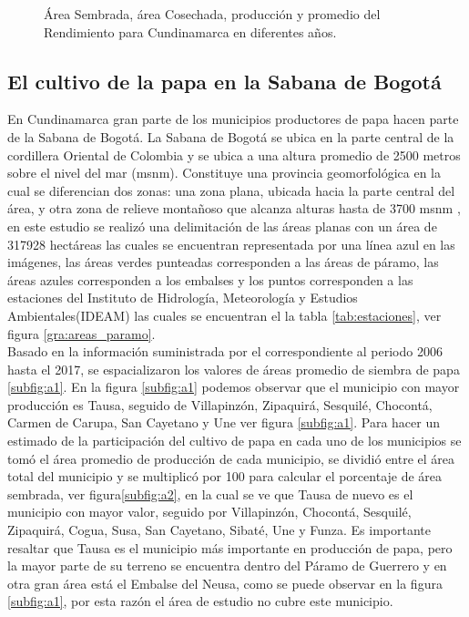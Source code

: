 \documentclass[11pt]{article}
\begin{document}
\begin{landscape}
\begin{figure}[h]
\begin{center}
	\end{center}
	
	\caption{Área Sembrada, área Cosechada, producción y promedio del Rendimiento para Cundinamarca en diferentes años.}
	 \label{gra:papa_cund}
\end{figure}

\end{landscape}

\subsection{El cultivo de la papa en la Sabana de Bogotá}


En Cundinamarca gran parte de los municipios productores de papa hacen parte de la Sabana de Bogotá. La Sabana de Bogotá se ubica en la parte central de la cordillera Oriental de Colombia y se ubica a una altura promedio de 2500 metros sobre el nivel del mar (msnm). Constituye una provincia geomorfológica en la cual se diferencian dos zonas: una zona plana, ubicada hacia la parte central del área, y otra zona de relieve montañoso que alcanza alturas hasta de 3700 msnm \citep{hermelin2007entorno}, en este estudio se realizó una delimitación de las áreas planas con un área de 317928 hectáreas las cuales se encuentran representada por una línea azul en las imágenes, las áreas verdes punteadas corresponden a las áreas de páramo, las áreas azules corresponden a los embalses y los puntos corresponden a las estaciones del Instituto de Hidrología, Meteorología y Estudios Ambientales(IDEAM) las cuales se encuentran el la tabla \ref{tab:estaciones}, ver figura \ref{gra:areas_paramo}.\\

Basado en la información suministrada por el \citet{madr2017} correspondiente al periodo 2006 hasta el 2017, se espacializaron los valores de áreas promedio de siembra de papa \ref{subfig:a1}. En la figura \ref{subfig:a1} podemos observar que el municipio con mayor producción es Tausa, seguido de Villapinzón, Zipaquirá, Sesquilé, Chocontá, Carmen de Carupa, San Cayetano y Une ver figura \ref{subfig:a1}. Para hacer un estimado de la participación del cultivo de papa en cada uno de los municipios se tomó el área promedio de producción de cada municipio, se dividió entre el área total del municipio y se multiplicó por 100 para calcular el porcentaje de área sembrada, ver figura\ref{subfig:a2}, en la cual se ve que Tausa de nuevo es el municipio con mayor valor, seguido por Villapinzón, Chocontá, Sesquilé, Zipaquirá, Cogua, Susa, San Cayetano, Sibaté, Une y Funza. Es importante resaltar que Tausa es el municipio más importante en producción de papa, pero la mayor parte de su terreno se encuentra dentro del Páramo de Guerrero y en otra gran área está el Embalse del Neusa, como se puede observar en la figura \ref{subfig:a1}, por esta razón el área de estudio no cubre este municipio.
\end{document}
